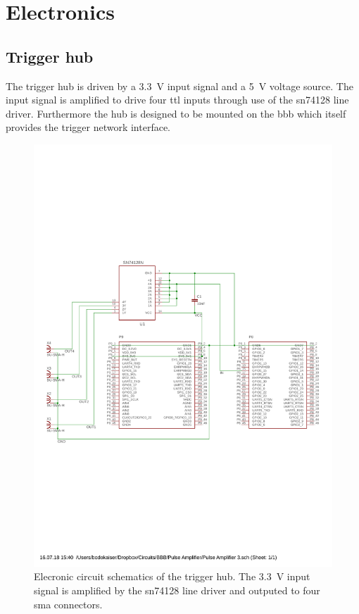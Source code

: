 \chapter{Electronics}

\section{Trigger hub}
\label{app:electronics:trigger_hub}

The trigger hub is driven by a \SI{3.3}{\volt} input signal and a
\SI{5}{\volt} voltage source. The input signal is amplified to drive four
\gls{ttl} inputs through use of the \gls{sn74128} \cite{SN74128} line driver.
Furthermore the hub is designed to be mounted on the \gls{bbb} which itself
provides the trigger network interface.
\begin{figure}[htb]
  \centering
  \includegraphics[width=\textwidth]{../media/schematic/line-driver.pdf}
  \caption{Elecronic circuit schematics of the trigger hub. The
    \SI{3.3}{\volt} input signal is amplified by the \gls{sn74128} line
    driver and outputed to four \gls{sma} connectors.
  }\label{fig:trigger_hub_schematic}
\end{figure}
